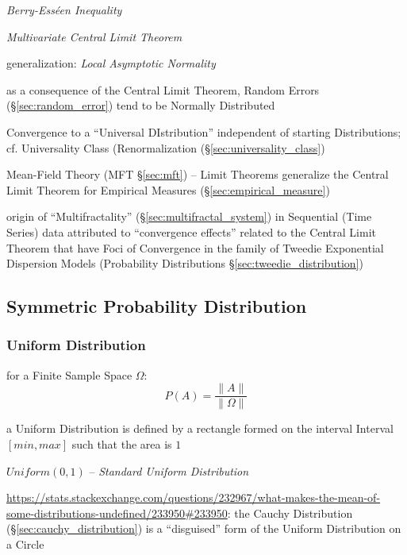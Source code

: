 \emph{Berry-Ess\'een Inequality}

\emph{Multivariate Central Limit Theorem}

generalization: \emph{Local Asymptotic Normality}

as a consequence of the Central Limit Theorem, Random Errors
(\S\ref{sec:random_error}) tend to be Normally Distributed

\fist Convergence to a ``Universal DIstribution'' independent of starting
Distributions; cf. Universality Class (Renormalization
(\S\ref{sec:universality_class})

\fist Mean-Field Theory (MFT \S\ref{sec:mft}) -- Limit Theorems generalize the
Central Limit Theorem for Empirical Measures (\S\ref{sec:empirical_measure})

\fist origin of ``Multifractality'' (\S\ref{sec:multifractal_system}) in
Sequential (Time Series) data attributed to ``convergence effects'' related to
the Central Limit Theorem that have Foci of Convergence in the family of Tweedie
Exponential Dispersion Models (Probability Distributions
\S\ref{sec:tweedie_distribution})



\subsection{Symmetric Probability Distribution}
\label{sec:symmetric_probability}

\subsubsection{Uniform Distribution}\label{sec:uniform_distribution}

for a Finite Sample Space $\Omega$:
\[
  P(A) = \frac{\|A\|}{\|\Omega\|}
\]

a Uniform Distribution is defined by a rectangle formed on the interval Interval
$[min,max]$ such that the area is $1$

$Uniform(0,1)$ -- \emph{Standard Uniform Distribution}

\url{https://stats.stackexchange.com/questions/232967/what-makes-the-mean-of-some-distributions-undefined/233950#233950}:
the Cauchy Distribution (\S\ref{sec:cauchy_distribution}) is a ``disguised''
form of the Uniform Distribution on a Circle



